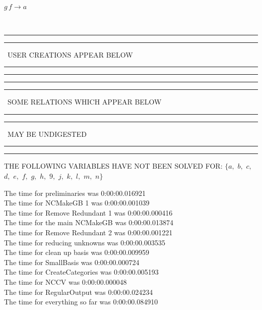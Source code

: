 \documentclass[rep10,leqno]{report}
\begin{document}
\begin{minipage}{6in}
$
g\,
 f\rightarrow a
$
\end{minipage}\\
\rule[2pt]{6in}{1pt}\hfil\break
\rule[2.5pt]{1.701in}{1pt}
\ USER CREATIONS APPEAR BELOW\ 
\rule[2.5pt]{1.701in}{1pt}\hfil\break
\rule[2pt]{6in}{1pt}\hfil\break
\rule[2pt]{6in}{4pt}\hfil\break
\rule[2pt]{1.45in}{4pt}
\ SOME RELATIONS WHICH APPEAR BELOW\ 
\rule[2pt]{1.45in}{4pt}\hfil\break
\rule[2pt]{2.18in}{4pt}
\ MAY BE UNDIGESTED\ 
\rule[2pt]{2.18in}{4pt}\hfil\break
\rule[2pt]{6in}{4pt}\hfil\break
THE FOLLOWING VARIABLES HAVE NOT BEEN SOLVED FOR:\hfil\break
$\{a,
$ $
b,
$ $
c,
$ $
d,
$ $
e,
$ $
f,
$ $
g,
$ $
h,
$ $
9,
$ $
j,
$ $
k,
$ $
l,
$ $
m,
$ $
n\}$
\smallskip\\
\vspace{10pt}

\noindent
The time for preliminaries was 0:00:00.016921\\
The time for NCMakeGB 1 was 0:00:00.001039\\
The time for Remove Redundant 1 was 0:00:00.000416\\
The time for the main NCMakeGB was 0:00:00.013874\\
The time for Remove Redundant 2 was 0:00:00.001221\\
The time for reducing unknowns was 0:00:00.003535\\
The time for clean up basis was 0:00:00.009959\\
The time for SmallBasis was 0:00:00.000724\\
The time for CreateCategories was 0:00:00.005193\\
The time for NCCV was 0:00:00.000048\\
The time for RegularOutput was 0:00:00.024234\\
The time for everything so far was 0:00:00.084910\\
\end{document}
